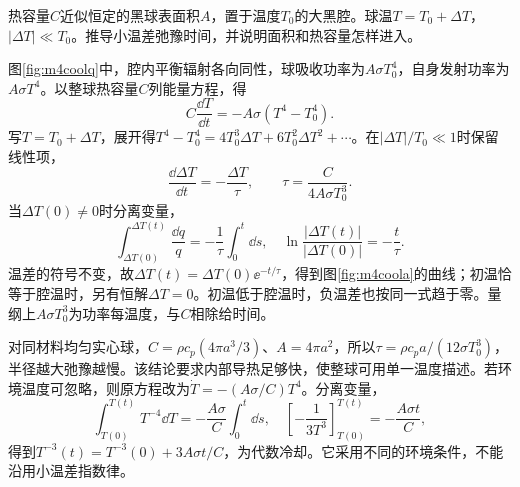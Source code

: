 \begin{exercise}\label{ex:m4radiativecool}
热容量$C$近似恒定的黑球表面积$A$，置于温度$T_0$的大黑腔。球温$T=T_0+\Delta T$，$|\Delta T|\ll T_0$。推导小温差弛豫时间，并说明面积和热容量怎样进入。
\end{exercise}
\begin{solution}
图\ref{fig:m4coolq}中，腔内平衡辐射各向同性，球吸收功率为$A\sigma T_0^4$，自身发射功率为$A\sigma T^4$。以整球热容量$C$列能量方程，得
\[
 C\frac{\dd T}{\dd t}=-A\sigma(T^4-T_0^4).
\]
写$T=T_0+\Delta T$，展开得$T^4-T_0^4=4T_0^3\Delta T+6T_0^2\Delta T^2+\cdots$。在$|\Delta T|/T_0\ll1$时保留线性项，
\[
 \frac{\dd\Delta T}{\dd t}=-\frac{\Delta T}{\tau},\qquad
 \tau=\frac{C}{4A\sigma T_0^3}.
\]
当$\Delta T(0)\ne0$时分离变量，
\[
 \int_{\Delta T(0)}^{\Delta T(t)}\frac{\dd q}{q}
 =-\frac1\tau\int_0^t\dd s,
 \quad \ln\frac{|\Delta T(t)|}{|\Delta T(0)|}=-\frac t\tau.
\]
温差的符号不变，故$\Delta T(t)=\Delta T(0)\ee^{-t/\tau}$，得到图\ref{fig:m4coola}的曲线；初温恰等于腔温时，另有恒解$\Delta T=0$。初温低于腔温时，负温差也按同一式趋于零。量纲上$A\sigma T_0^3$为功率每温度，与$C$相除给时间。

对同材料均匀实心球，$C=\rho c_p(4\pi a^3/3)$、$A=4\pi a^2$，所以$\tau=\rho c_pa/(12\sigma T_0^3)$，半径越大弛豫越慢。该结论要求内部导热足够快，使整球可用单一温度描述。若环境温度可忽略，则原方程改为$\dot T=-(A\sigma/C)T^4$。分离变量，
\[
 \int_{T(0)}^{T(t)}T^{-4}\dd T=-\frac{A\sigma}{C}\int_0^t\dd s,
 \quad \left[-\frac1{3T^3}\right]_{T(0)}^{T(t)}=-\frac{A\sigma t}{C},
\]
得到$T^{-3}(t)=T^{-3}(0)+3A\sigma t/C$，为代数冷却。它采用不同的环境条件，不能沿用小温差指数律。
\end{solution}

